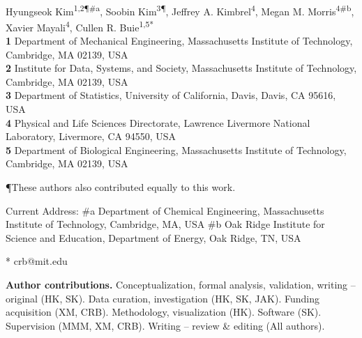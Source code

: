 \documentclass[10pt,letterpaper]{article}
\newcommand{\1}{{\rm 1}\kern-0.24em{\rm I}}
\begin{document}
\vspace*{0.2in}

\begin{flushleft}
{\Large
\textbf{}
}
\newline
\\
Hyungseok Kim\textsuperscript{1,2\P \#\!a},
Soobin Kim\textsuperscript{3\P},
Jeffrey A. Kimbrel\textsuperscript{4},
Megan M. Morris\textsuperscript{4\#\!b},
Xavier Mayali\textsuperscript{4},
Cullen R. Buie\textsuperscript{1,5*}
\\
\bigskip
\textbf{1} Department of Mechanical Engineering, Massachusetts Institute of Technology, Cambridge, MA 02139, USA
\\
\textbf{2} Institute for Data, Systems, and Society, Massachusetts Institute of Technology, Cambridge, MA 02139, USA
\\
\textbf{3} Department of Statistics, University of California, Davis, Davis, CA 95616, USA
\\
\textbf{4} Physical and Life Sciences Directorate, Lawrence Livermore National Laboratory, Livermore, CA 94550, USA
\\
\textbf{5} Department of Biological Engineering, Massachusetts Institute of Technology, Cambridge, MA 02139, USA
\\
\bigskip

\P These authors also contributed equally to this work.

Current Address: \#\!a Department of Chemical Engineering, Massachusetts Institute of Technology, Cambridge, MA, USA %
\#\!b Oak Ridge Institute for Science and Education, Department of Energy, Oak Ridge, TN, USA 

* crb@mit.edu

\textbf{Author contributions.} Conceptualization, formal analysis, validation, writing – original (HK, SK). Data curation, investigation (HK, SK, JAK). Funding acquisition (XM, CRB). Methodology, visualization (HK). Software (SK). Supervision (MMM, XM, CRB).  Writing – review \& editing (All authors).

\end{flushleft}
\end{document}
